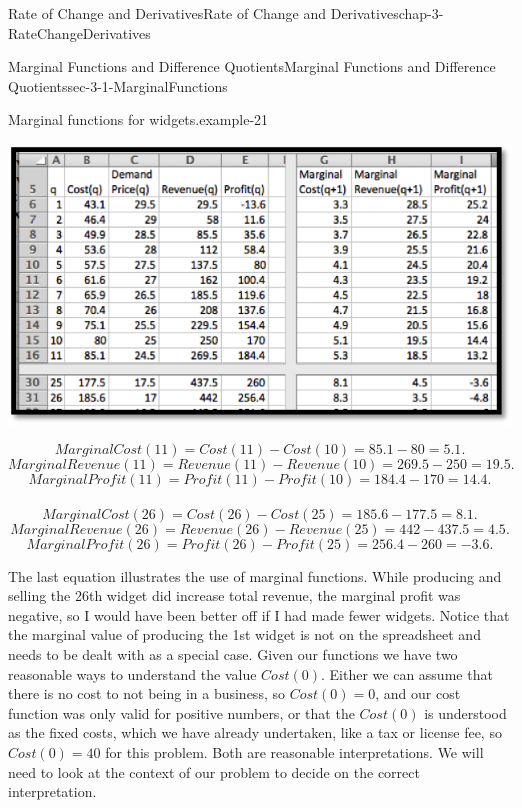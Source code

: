 \documentclass[oneside,10pt,]{book}
\numberwithin{equation}{section}
\begin{document}
\begin{chapterptx}{Rate of Change and Derivatives}{}{Rate of Change and Derivatives}{}{}{chap-3-RateChangeDerivatives}
\begin{sectionptx}{Marginal Functions and Difference Quotients}{}{Marginal Functions and Difference Quotients}{}{}{sec-3-1-MarginalFunctions}
\begin{example}{Marginal functions for widgets.}{example-21}
\begin{sidebyside}{1}{0.15}{0.15}{0}
\begin{sbspanel}{0.7}%
\includegraphics[width=1\linewidth]{images/sec3-1-3.png}
\end{sbspanel}%
\end{sidebyside}%
%
\begin{equation*}
Marginal Cost(11)=Cost(11)-Cost(10)=85.1-80=5.1.
\end{equation*}
%
\begin{equation*}
Marginal Revenue(11)=Revenue(11)-Revenue(10)=269.5-250=19.5.
\end{equation*}
%
\begin{equation*}
Marginal Profit(11)=Profit(11)-Profit(10)=184.4-170=14.4.
\end{equation*}
\hypertarget{p-915}{}%
\(\ \)%
%
\begin{equation*}
Marginal Cost(26)=Cost(26)-Cost(25)=185.6-177.5=8.1.
\end{equation*}
%
\begin{equation*}
Marginal Revenue(26)=Revenue(26)-Revenue(25)=442-437.5=4.5.
\end{equation*}
%
\begin{equation*}
Marginal Profit(26)=Profit(26)-Profit(25)=256.4-260=-3.6.
\end{equation*}
\end{example}
\hypertarget{p-916}{}%
The last equation illustrates the use of marginal functions.  While producing and selling the 26th widget did increase total revenue, the marginal profit was negative, so I would have been better off if I had made fewer widgets. Notice that the marginal value of producing the 1st widget is not on the spreadsheet and needs to be dealt with as a special case.  Given our functions we have two reasonable ways to understand the value \(Cost(0)\).  Either we can assume that there is no cost to not being in a business, so \(Cost(0)=0\), and our cost function was only valid for positive numbers, or that the \(Cost(0)\) is understood as the fixed costs, which we have already undertaken, like a tax or license fee, so \(Cost(0)=40\) for this problem.  Both are reasonable interpretations.  We will need to look at the context of our problem to decide on the correct interpretation.%

\end{sectionptx}
\end{chapterptx}
\end{document}
